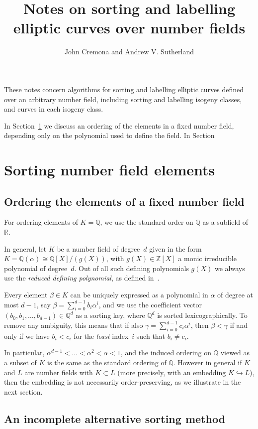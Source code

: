 \documentclass{article}
\title{Notes on sorting and labelling elliptic curves over number fields}
\author{John Cremona and Andrew V. Sutherland}
\theoremstyle{remark}
\def\Z{{\mathbb Z}}
\def\Q{{\mathbb Q}}
\def\R{{\mathbb R}}
\begin{document}
\maketitle

These notes concern algorithms for sorting and labelling elliptic
curves defined over an arbitrary number field, including sorting and
labelling isogeny classes, and curves in each isogeny class.

In Section~\ref{sec:nfsort} we discuss an ordering of the elements in
a fixed number field, depending only on the polynomial used to define
the field.  In Section

\section{Sorting number field elements}
\label{sec:nfsort}
\subsection{Ordering the elements of a fixed number field}\label{sec:ordfix}
For ordering elements of $K=\Q$, we use the standard order on $\Q$ as
a subfield of~$\R$.

In general, let $K$ be a number field of degree~$d$ given in the form
$K=\Q(\alpha)\cong \Q[X]/(g(X))$, with $g(X)\in\Z[X]$ a monic
irreducible polynomial of degree~$d$.  Out of all such {defining
  polynomials} $g(X)$ we always use the \emph{reduced defining polynomial},
as defined in~\cite{CremonaPageSutherland}.

Every element $\beta\in K$ can be uniquely expressed as a polynomial
in $\alpha$ of degree at most $d-1$, say
$\beta=\sum_{i=0}^{d-1}b_i\alpha^i$, and we use the coefficient vector
$(b_0,b_1,\dots,b_{d-1})\in\Q^d$ as a sorting key, where $\Q^d$ is
sorted lexicographically.  To remove any ambiguity, this means that if
also $\gamma=\sum_{i=0}^{d-1}c_i\alpha^i$, then $\beta<\gamma$ if and
only if we have $b_i<c_i$ for the \textit{least} index~$i$ such that
$b_i\not=c_i$.

In particular, $\alpha^{d-1}<\dots<\alpha^2<\alpha<1$, and the induced
ordering on $\Q$ viewed as a subset of $K$ is the same as the standard
ordering of $\Q$.  However in general if $K$ and $L$ are number fields
with $K\subset L$ (more precisely, with an embedding $K\hookrightarrow
L$), then the embedding is not necessarily order-preserving, as we
illustrate in the next section.

\subsection{An incomplete alternative sorting method}
\end{document}

